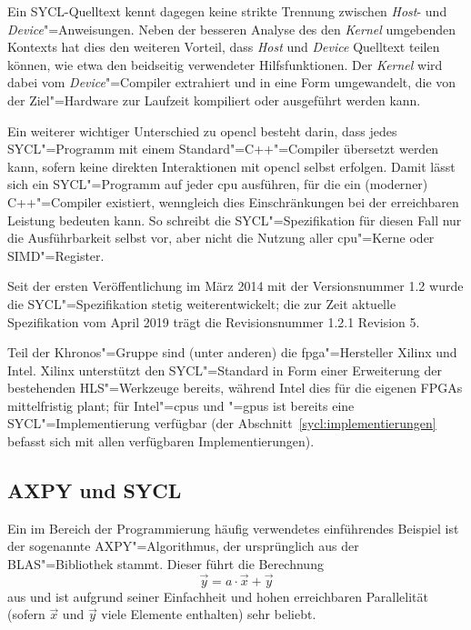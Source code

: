 Ein SYCL-Quelltext kennt dagegen keine strikte Trennung zwischen \textit{Host}-
und \textit{Device}"=Anweisungen. Neben der besseren Analyse des den
\textit{Kernel} umgebenden Kontexts hat dies den weiteren Vorteil, dass
\textit{Host} und \textit{Device} Quelltext teilen können, wie etwa den
beidseitig verwendeter Hilfsfunktionen. Der \textit{Kernel} wird dabei vom
\textit{Device}"=Compiler extrahiert und in eine Form umgewandelt, die von der
Ziel"=Hardware zur Laufzeit kompiliert oder ausgeführt werden kann.
\cite[vgl][35]{sycl2019}

Ein weiterer wichtiger Unterschied zu \gls{opencl} besteht darin, dass
jedes SYCL"=Programm mit einem Standard"=C++"=Compiler übersetzt werden kann,
sofern keine direkten Interaktionen mit \gls{opencl} selbst erfolgen. Damit
lässt sich ein SYCL"=Programm auf jeder \gls{cpu} ausführen, für die ein
(moderner) C++"=Compiler existiert, wenngleich dies Einschränkungen bei der
erreichbaren Leistung bedeuten kann. So schreibt die SYCL"=Spezifikation für
diesen Fall nur die Ausführbarkeit selbst vor, aber nicht die Nutzung aller
\gls{cpu}"=Kerne oder SIMD"=Register. \cite[vgl.][15]{sycl2019}

Seit der ersten Veröffentlichung im März 2014 \cite[vgl.][]{khronos2014} mit der
Versionsnummer 1.2 wurde die SYCL"=Spezifikation stetig weiterentwickelt; die
zur Zeit aktuelle Spezifikation vom April 2019 trägt die Revisionsnummer 1.2.1
Revision 5. \cite[vgl.][1]{sycl2019}

Teil der Khronos"=Gruppe sind (unter anderen) die \gls{fpga}"=Hersteller Xilinx
und Intel. Xilinx unterstützt den SYCL"=Standard in Form einer Erweiterung der
bestehenden HLS"=Werkzeuge bereits, während Intel dies für die eigenen FPGAs
mittelfristig plant; für Intel"=\gls{cpu}s und "=\gls{gpu}s ist bereits eine
SYCL"=Implementierung verfügbar (der Abschnitt~\ref{sycl:implementierungen}
befasst sich mit allen verfügbaren Implementierungen).

\subsection{AXPY und SYCL}\label{sycl:ueberblick:saxpy}

Ein im Bereich der Programmierung häufig verwendetes einführendes Beispiel
ist der sogenannte AXPY"=Algorithmus, der ursprünglich aus der BLAS"=Bibliothek
stammt. Dieser führt die Berechnung
\[\vec{y} = a \cdot \vec{x} + \vec{y}\]
aus und ist aufgrund seiner Einfachheit und hohen erreichbaren Parallelität
(sofern $\vec{x}$ und $\vec{y}$ viele Elemente enthalten) sehr beliebt.
\cite[vgl.][]{lawson1979}

